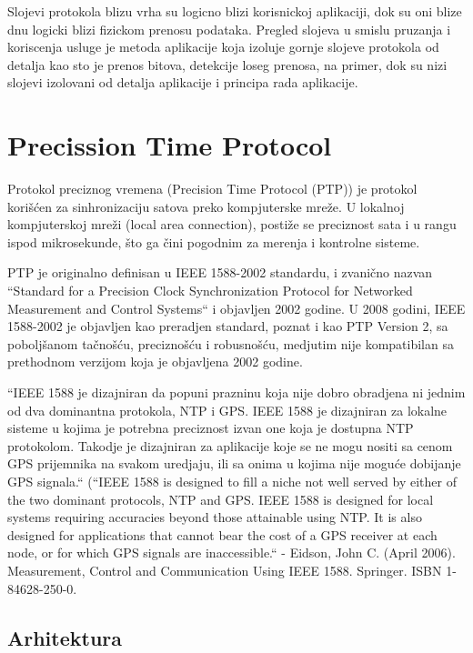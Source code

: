\documentclass[a4paper,12pt, master]{etf}
\begin{document}
	Slojevi protokola blizu vrha su logicno blizi korisnickoj aplikaciji, dok su oni blize dnu 
	logicki blizi fizickom prenosu podataka. Pregled slojeva u smislu pruzanja i koriscenja 
	usluge je metoda aplikacije koja izoluje gornje slojeve protokola od detalja kao sto je 
	prenos bitova, detekcije loseg prenosa, na primer, dok su nizi slojevi izolovani od detalja 
	aplikacije i principa rada aplikacije.

	\section{Precission Time Protocol}
    
	Protokol preciznog vremena (Precision Time Protocol (PTP)) je protokol
	kori\v{s}\'{c}en za sinhronizaciju satova preko kompjuterske mre\v{z}e. U lokalnoj
	kompjuterskoj mre\v{z}i (local area connection), posti\v{z}e se preciznost sata i u rangu
	ispod mikrosekunde, \v{s}to ga \v{c}ini pogodnim za merenja i kontrolne sisteme.

	PTP je originalno definisan u IEEE 1588-2002 standardu, i zvani\v{c}no nazvan
	``Standard for a Precision Clock Synchronization Protocol for Networked Measurement
	and Control Systems`` i objavljen 2002 godine. U 2008 godini, IEEE 1588-2002 je
    objavljen kao preradjen standard, poznat i kao PTP Version 2, sa pobolj\v{s}anom 
    ta\v{c}no\v{s}\'{c}u, precizno\v{s}\'{c}u i robusno\v{s}\'{c}u, medjutim nije kompatibilan 
    sa prethodnom verzijom koja je objavljena 2002 godine.

	``IEEE 1588 je dizajniran da popuni prazninu koja nije dobro obradjena ni jednim od dva
	dominantna protokola, NTP i GPS. IEEE 1588 je dizajniran za lokalne sisteme u kojima je
	potrebna preciznost izvan one koja je dostupna NTP protokolom. Takodje je dizajniran za
	aplikacije koje se ne mogu nositi sa cenom GPS prijemnika na svakom uredjaju, ili sa onima 
    u kojima nije mogu\'{c}e dobijanje GPS signala.`` (``IEEE 1588 is designed to fill a niche 
    not well served by either of the two dominant protocols, NTP and GPS. IEEE 1588 is designed 
    for local systems requiring accuracies beyond those attainable using NTP. It is also designed 
    for applications that cannot bear the cost of a GPS receiver at each node, or for which GPS 
    signals are inaccessible.`` - Eidson, John C. (April 2006). Measurement, Control and 
    Communication Using IEEE 1588. Springer. ISBN 1-84628-250-0.

    \subsection{Arhitektura}
    
\end{document}
